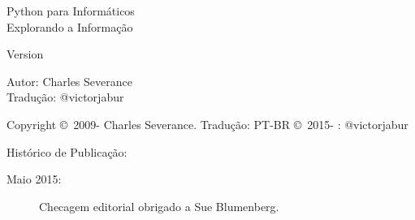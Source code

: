 



\def\exercisename{Exercício}

\newtheorem{ex}{\exercisename}[chapter]

\begin{latexonly}

\renewcommand{\blankpage}{\thispagestyle{empty} \quad \newpage}

\thispagestyle{empty}

\begin{flushright}
\vspace*{2.0in}

\begin{spacing}{3}
{\huge Python para Informáticos}\\
{\Large Explorando a Informação}
\end{spacing}

\vspace{0.25in}

Version \theversion

\vspace{0.5in}


{\Large
Autor: Charles Severance\\
Tradução: @victorjabur
}

\vfill

\end{flushright}

\pagebreak
\thispagestyle{empty}

{\small
Copyright \copyright ~2009- Charles Severance.
Tradução: PT-BR \copyright ~2015- : @victorjabur

Histórico de Publicação:

\begin{description}

\item[Maio 2015:] Checagem editorial obrigado a Sue Blumenberg.


\end{description}}
\end{latexonly}
